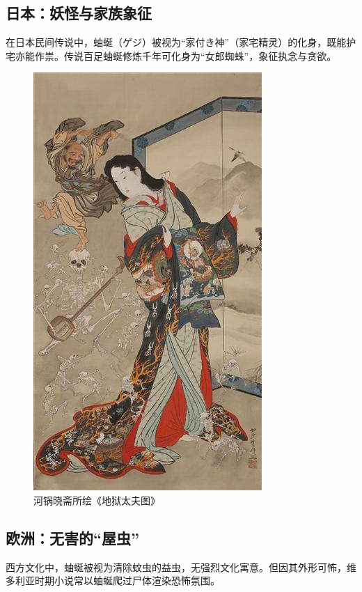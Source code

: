 \subsection{日本：妖怪与家族象征}
在日本民间传说中，蚰蜒（ゲジ）被视为``家付き神''（家宅精灵）的化身，既能护宅亦能作祟。传说百足蚰蜒修炼千年可化身为``女郎蜘蛛''，象征执念与贪欲。
\begin{figure}[H]
    \centering
    \includegraphics[width = .4\textwidth]{../assets/1.0/图一：河锅晓斋《地狱太夫图》.jpg}
    \caption{河锅晓斋所绘《地狱太夫图》}
\end{figure}

\subsection{欧洲：无害的``屋虫''}
西方文化中，蚰蜒被视为清除蚊虫的益虫，无强烈文化寓意。但因其外形可怖，维多利亚时期小说常以蚰蜒爬过尸体渲染恐怖氛围。